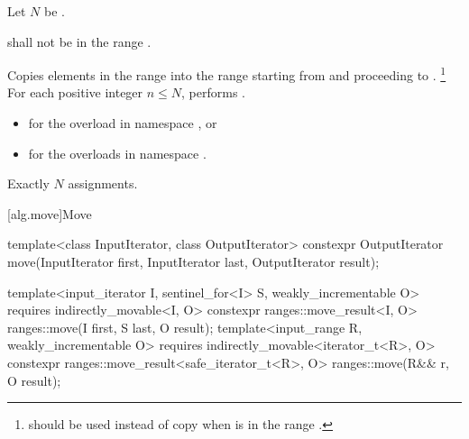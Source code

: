 \begin{itemdescr}
\pnum
Let $N$ be .

\pnum
\requires
{} shall not be in the range .

\pnum
\effects
Copies elements in the range 
into the range 
starting from  and proceeding to .%
\footnote{ should be used instead of copy
when  is in the range .}
For each positive integer $n \le N$,
performs .

\pnum
\returns
\begin{itemize}
\item
  for the overload in namespace , or
\item
  for the overloads in namespace .
\end{itemize}

\pnum
\complexity
Exactly $N$ assignments.
\end{itemdescr}

[alg.move]{Move}

%
\begin{itemdecl}
template<class InputIterator, class OutputIterator>
  constexpr OutputIterator move(InputIterator first, InputIterator last,
                                OutputIterator result);

template<input_iterator I, sentinel_for<I> S, weakly_incrementable O>
  requires indirectly_movable<I, O>
  constexpr ranges::move_result<I, O>
    ranges::move(I first, S last, O result);
template<input_range R, weakly_incrementable O>
  requires indirectly_movable<iterator_t<R>, O>
  constexpr ranges::move_result<safe_iterator_t<R>, O>
    ranges::move(R&& r, O result);
\end{itemdecl}

